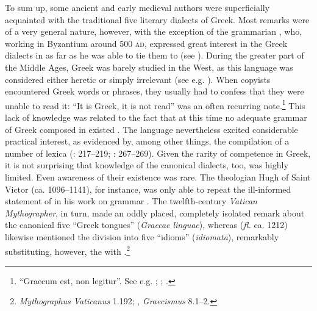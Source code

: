 To sum up, some ancient and early medieval  authors were superficially acquainted with the traditional five literary dialects of Greek. Most remarks were of a very general nature, however, with the exception of the  grammarian , who, working in Byzantium around 500 \textsc{ad}, expressed great interest in the Greek dialects in as far as he was able to tie them to  (see \citealt{Conduche_latin_nodate}). During the greater part of the Middle Ages, Greek was barely studied in the West, as this language was considered either heretic or simply irrelevant (see e.g. \citealt{Boulhol2014}). When copyists encountered Greek words or phrases, they usually had to confess that they were unable to read it: “It is Greek, it is not read” was an often recurring note.\footnote{ “Graecum est, non legitur”. See e.g. \citet[\textsc{i.}246–275]{Bischoff1961, Bischoff1981}; {\citet[esp. 3ff]{Weiss1977}; \citet[36]{Saladin2000}.}} This lack of knowledge was related to the fact that at this time no adequate grammar of Greek composed in  existed \citep[215]{Bischoff1961}. The language nevertheless excited considerable practical interest, as evidenced by, among other things, the compilation of a number of lexica (\citealt{Bischoff1961}: 217–219; \citealt{Dahan1995}: 267–269). Given the rarity of competence in Greek, it is not surprising that knowledge of the canonical dialects, too, was highly limited. Even awareness of their existence was rare. The theologian Hugh of Saint Victor (ca. 1096–1141), for instance, was only able to repeat the ill-informed statement of  in his work on grammar \citep[79]{Hugh1966}. The twelfth-century \textit{Vatican Mythographer}, in turn, made an oddly placed, completely isolated remark about the canonical five “Greek tongues” (\textit{Graecae linguae}), whereas  (\textit{fl.} ca. 1212) likewise mentioned the division into five “idioms” (\textit{idiomata}), remarkably substituting, however, the  with .\footnote{\textit{Mythographus Vaticanus} 1.192; , \textit{Graecismus} 8.1–2.}

